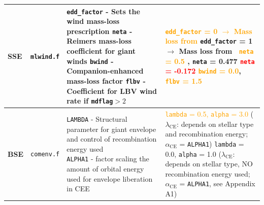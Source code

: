 \begin{landscape}
\begin{table}
\begin{tabular}{|l|l|l|l|}
				\hline \textbf{SSE} & \texttt{mlwind.f} & \makecell[l]{\texttt{edd\_factor} - Sets the wind mass-loss prescription \\ \texttt{neta} - Reimers mass-loss coefficient for giant winds \\  \texttt{bwind} - Companion-enhanced mass-loss factor \\ \texttt{flbv} - Coefficient for LBV wind rate if \texttt{mdflag}$>2$} & \makecell[l]{\textcolor{orange}{\texttt{edd\_factor} = 0 $\rightarrow$ Mass loss from} \cite{Belczynskietal2010,Chenetal2015} \\ \texttt{edd\_factor} = 1 $\rightarrow$ Mass loss from \cite{Chenetal2015,Giacobboetal2018} \\ \ \textcolor{orange}{\texttt{neta} = 0.5} \cite{KudritzkiReimers1978}, \texttt{neta} = 0.477 \cite{McDonaldZijlstra2015} \\  \textcolor{red}{\texttt{neta} = -0.172} \cite{SchroederCuntz2005} \\ \textcolor{orange}{\texttt{bwind} = 0.0}, \cite{Hurley2002} \quad \textcolor{orange}{\texttt{flbv} = 1.5} \cite{Belczynskietal2010}} \\
				\hline \hline \textbf{BSE} & \texttt{comenv.f} & \makecell[l]{\texttt{LAMBDA} - Structural parameter for giant envelope \\ and control of recombination energy used \\ \texttt{ALPHA1} - factor scaling the amount of orbital energy \\ used for envelope liberation in CEE} & \makecell[l]{ \textcolor{orange}{\texttt{lambda} = 0.5, \texttt{alpha} = 3.0} \cite{GiacobboMapelli2018} ($\lambda_{\mathrm{CE}}$: depends on stellar type \\ and recombination energy; $\alpha_{\mathrm{CE}}$ = \texttt{ALPHA1}) \\ \texttt{lambda} = 0.0, \texttt{alpha} = 1.0 ($\lambda_{\mathrm{CE}}$: depends on stellar type, \\ NO recombination energy used; $\alpha_{\mathrm{CE}}$ = \texttt{ALPHA1}, see Appendix A1)}\\

\end{tabular}
\end{table}
\end{landscape}
